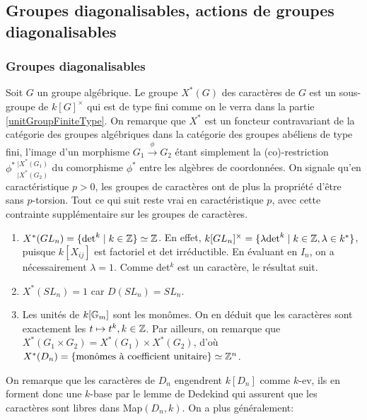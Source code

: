 \subsection{Groupes diagonalisables, actions de groupes diagonalisables}

\subsubsection{Groupes diagonalisables}
Soit $G$ un groupe algébrique. Le groupe $X^*(G)$ des caractères de $G$ est un sous-groupe de $k[G]^\times$ qui est de type fini comme on le verra dans la partie \ref{unitGroupFiniteType}. On remarque que $X^*$ est un foncteur contravariant de la catégorie des groupes algébriques dans la catégorie des groupes abéliens de type fini, l'image d'un morphisme $G_1\xrightarrow{\phi}G_2$ étant simplement la (co)-restriction $\phi^* \,_{|X^*(G_2)}^{|X^*(G_1)}$ du comorphisme $\phi^*$ entre les algèbres de coordonnées. On signale qu'en caractéristique $p>0$, les groupes de caractères ont de plus la propriété d'être sans $p$-torsion. Tout ce qui suit reste vrai en caractéristique $p$, avec cette contrainte supplémentaire sur les groupes de caractères.

\begin{ex}
\begin{enumerate}
\item $X^*(GL_n)=\lbrace \textrm{det}^k\mid k\in \mathbb{Z} \rbrace\simeq\mathbb{Z}$. En effet, $k[GL_n]^\times =\lbrace \lambda\textrm{det}^k\mid k\in \mathbb{Z}, \lambda\in k^* \rbrace$, puisque $k[X_{ij}]$ est factoriel et det irréductible. En évaluant en $I_n$, on a nécessairement $\lambda=1$. Comme det$^k$ est un caractère, le résultat suit.
\item $X^*(SL_n)={1}$ car $D(SL_n)=SL_n$.
\item Les unités de $k[\mathbb{G}_m]$ sont les monômes. On en déduit que les caractères sont exactement les $t\mapsto t^k, k\in \mathbb{Z}$. Par ailleurs, on remarque que $X^*(G_1\times G_2)=X^*(G_1)\times X^*(G_2)$, d'où $X^*(D_n)=\lbrace \textrm{monômes à coefficient unitaire} \rbrace \simeq \mathbb{Z}^n$.
\end{enumerate}
\end{ex}

On remarque que les caractères de $D_n$ engendrent $k[D_n]$ comme $k$-ev, ils en forment donc une $k$-base par le lemme de Dedekind qui assurent que les caractères sont libres dans Map$(D_n, k)$. On a plus généralement:

